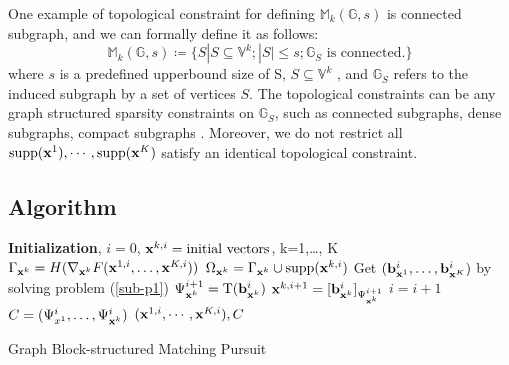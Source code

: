 \documentclass{article}
\let\oldReturn\Return
\renewcommand{\Return}{\State\oldReturn}
\DeclareMathOperator*{\argmax}{arg\,max}
\begin{document}
One example of topological constraint for defining $\mathbb{M}_k(\mathbb{G}, s)$ is connected subgraph, and we can formally define it as follows:
\begin{equation}
    \mathbb{M}_k(\mathbb{G}, s) \coloneqq \{S | S \subseteq \mathbb{V}^k; |S| \leq s; \mathbb{G}_S \text{ is connected.} \}
\end{equation}
where $s$ is a predefined upperbound size of S, $S\subseteq \mathbb{V}^k$ , and $\mathbb{G}_S$ refers to the induced subgraph by a set of vertices $S$. The topological constraints can be any graph structured sparsity constraints on $\mathbb{G}_S$, such as connected subgraphs, dense subgraphs, compact subgraphs \cite{chen2017generic}. Moreover, we do not restrict all $\mathrm{supp}({\bf x}^1),\cdots, \mathrm{supp}({\bf x}^K)$ satisfy an identical topological constraint.

\subsection{Algorithm}

\begin{algorithm}%
	\begin{algorithmic}[1]
		\State \textbf{Initialization}, $ i=0 $, $ {\bf x}^{k,i}=\text{initial vectors}$, k=1,\dots, K
		\Repeat
		\State $\Gamma_{{\bf x}^{k}}=H(\nabla_{{\bf x}^{k}} F({\bf x}^{1,i}, \dots,{\bf x}^{K,i}))$
		\State $\Omega_{{\bf x}^{k}}=\Gamma_{{\bf x}^{k}}\cup\mathrm{supp}({\bf x}^{k,i})$
		\EndFor
		\State Get $({\bf b}_{{\bf x}^1}^i,\dots,{\bf b}_{{\bf x}^K}^i)$ by solving problem (\ref{sub-p1})\label{alg:line:subproblem}
		\State $ \Psi_{{\bf x}^{k}}^{i+1}=\mathrm{T}({\bf b}_{{\bf x}^k}^i) $
		\State $ {\bf x}^{k,i+1}=[{\bf b}_{{\bf x}^{k}}^i]_{\Psi_{{\bf x}^{k}}^{i+1}} $
		\EndFor
		\State $ i=i+1 $
		\State $ C=(\Psi_{x^1}^{i}, \dots, \Psi_{{\bf x}^k}^{i}) $
		\Return $ ( {\bf x}^{1,i}, \cdots, {\bf x}^{K,i}) , C $
	\end{algorithmic}
	\caption{Graph Block-structured Matching Pursuit}\label{alg:gbmp}
\end{algorithm}
\end{document}
